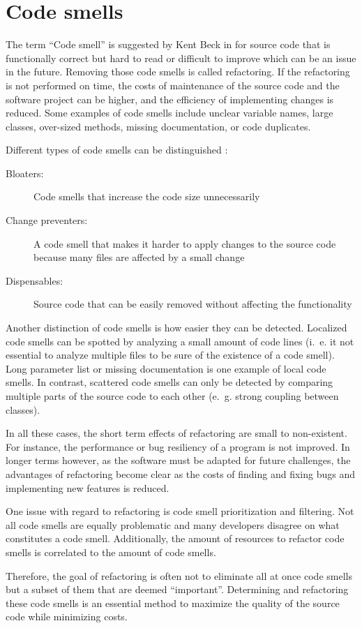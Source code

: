 \section{Code smells}\label{sec:code_smell}

The term \enquote{Code smell} is suggested by Kent Beck in \cite{fowler2019refactoring} for source code that is functionally correct but hard to read or difficult to improve which can be an issue in the future. Removing those code smells is called refactoring. If the refactoring is not performed on time, the costs of maintenance of the source code and the software project can be higher, and the efficiency of implementing changes is reduced. Some examples of code smells include unclear variable names, large classes, over-sized methods, missing documentation, or code duplicates. 

Different types of code smells can be distinguished \cite{data_clumps_refactoring_guru}:
\begin{description}
    \item [Bloaters:] Code smells that increase the code size unnecessarily 
    \item [Change preventers:] A code smell that makes it harder to apply changes to the source code because many files are affected by a small change
    \item [Dispensables:] Source code that can be easily removed without affecting the functionality
\end{description}

Another distinction of code smells is how easier they can be detected. Localized code smells can be spotted by analyzing a small amount of code lines (i.~e. it not essential to analyze multiple files to be sure of the existence of a code smell). Long parameter list or missing documentation is one example of local code smells.  In contrast, scattered code smells can only be detected by comparing multiple parts of the source code to each other (e.~g. strong coupling between classes). \cite{10.1007/978-3-030-29238-6_19}

In all these cases, the short term effects of refactoring are small to non-existent. For instance, the performance or bug resiliency of a program is not improved. In longer terms however, as the software must be adapted for future challenges, the advantages of refactoring become clear as the costs of finding and fixing bugs and implementing new features is reduced. 

One issue with regard to refactoring is code smell prioritization and filtering. Not all code smells are equally problematic and many developers disagree on what constitutes a code smell. Additionally,  the amount of resources to refactor code smells is correlated to the amount of code smells. \cite{10.1007/978-981-13-8300-7_21}

Therefore, the goal of refactoring is often not to eliminate all at once code smells but a subset of them that are deemed \enquote{important}. Determining and refactoring these code smells is an essential method to maximize the quality of the source code while minimizing costs.